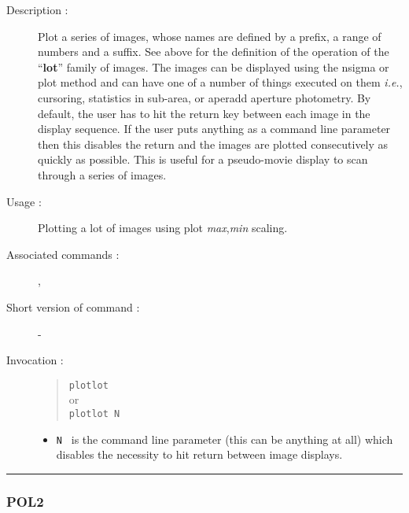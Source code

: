 \begin{description}

\item[Description :] Plot a series of images, whose names are defined
by a prefix, a range of numbers and a suffix. See above for the
definition of the operation of the ``{\bf lot}'' family of images.  The
images can be displayed using the nsigma or plot method and can have
one of a number of things executed on them \emph{i.e.}, cursoring,
statistics in sub-area, or aperadd aperture photometry.  By default,
the user has to hit the return key between each image in the display
sequence.  If the user puts anything as a command line parameter then
this disables the return and the images are plotted consecutively as
quickly as possible.  This is useful for a pseudo-movie display to scan
through a series of images.

\item[Usage :] Plotting a lot of images using plot {\it max},{\it min} scaling.
\item[Associated commands :] {\tt {}},
{\tt {}}
\item[Short version of command :] -
\item[Invocation :]

\begin{quote}{\tt  plotlot }\\
or \\
{\tt plotlot N }
\end{quote}

\begin{itemize}

\item {\tt N } is the command line parameter (this can be anything
  at all) which disables the necessity to hit return between
image displays.
\end{itemize}

\end{description}

\hrule
\subsubsection*{\label{POL2}POL2}

